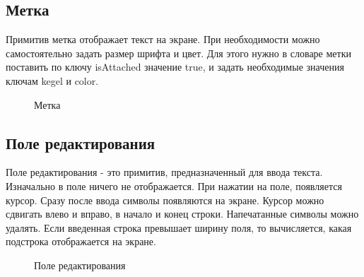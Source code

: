 \documentclass[14pt]{extarticle}
\begin{document}
	\subsection*{Метка}
		Примитив метка отображает текст на экране. При необходимости можно самостоятельно задать размер шрифта и цвет. Для этого нужно в словаре метки поставить по ключу isAttached значение true, и задать необходимые значения ключам kegel и color. 
		\begin{figure}[h]
		\caption{ Метка }
		\label{ris:image}
		\end{figure}	

	\subsection*{Поле редактирования}
		Поле редактирования - это примитив, предназначенный для ввода текста. Изначально в поле ничего не отображается. При нажатии на поле, появляется курсор. Сразу после ввода символы появляются на экране. Курсор можно сдвигать влево и вправо, в начало и конец строки. Напечатанные символы можно удалять. Если введенная строка превышает ширину поля, то вычисляется, какая подстрока отображается на экране. 
		\begin{figure}[h]
		\caption{ Поле редактирования }
		\label{ris:image}
		\end{figure}	
\end{document}
